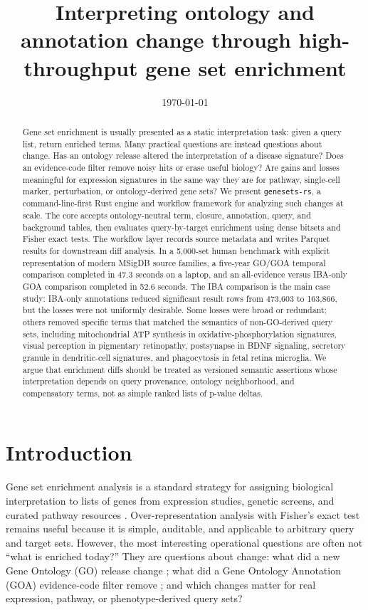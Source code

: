 \documentclass[11pt]{article}
\title{Interpreting ontology and annotation change through high-throughput gene set enrichment}
\author{
  \todo{Authors}
}
\date{\today}
\newcommand{\tool}{\texttt{genesets-rs}}
\begin{document}
\maketitle

\begin{abstract}
Gene set enrichment is usually presented as a static interpretation task: given a query list, return enriched terms. Many practical questions are instead questions about change. Has an ontology release altered the interpretation of a disease signature? Does an evidence-code filter remove noisy hits or erase useful biology? Are gains and losses meaningful for expression signatures in the same way they are for pathway, single-cell marker, perturbation, or ontology-derived gene sets? We present \tool, a command-line-first Rust engine and workflow framework for analyzing such changes at scale. The core accepts ontology-neutral term, closure, annotation, query, and background tables, then evaluates query-by-target enrichment using dense bitsets and Fisher exact tests. The workflow layer records source metadata and writes Parquet results for downstream diff analysis. In a 5,000-set human benchmark with explicit representation of modern MSigDB source families, a five-year GO/GOA temporal comparison completed in 47.3 seconds on a laptop, and an all-evidence versus IBA-only GOA comparison completed in 52.6 seconds. The IBA comparison is the main case study: IBA-only annotations reduced significant result rows from 473,603 to 163,866, but the losses were not uniformly desirable. Some losses were broad or redundant; others removed specific terms that matched the semantics of non-GO-derived query sets, including mitochondrial ATP synthesis in oxidative-phosphorylation signatures, visual perception in pigmentary retinopathy, postsynapse in BDNF signaling, secretory granule in dendritic-cell signatures, and phagocytosis in fetal retina microglia. We argue that enrichment diffs should be treated as versioned semantic assertions whose interpretation depends on query provenance, ontology neighborhood, and compensatory terms, not as simple ranked lists of p-value deltas.
\end{abstract}

\section{Introduction}

Gene set enrichment analysis is a standard strategy for assigning biological interpretation to lists of genes from expression studies, genetic screens, and curated pathway resources \citep{subramanian2005}. Over-representation analysis with Fisher's exact test \citep{fisher1922} remains useful because it is simple, auditable, and applicable to arbitrary query and target sets. However, the most interesting operational questions are often not ``what is enriched today?'' They are questions about change: what did a new Gene Ontology (GO) release change \citep{ashburner2000,go2023}; what did a Gene Ontology Annotation (GOA) evidence-code filter remove \citep{goa2015}; and which changes matter for real expression, pathway, or phenotype-derived query sets?
\end{document}
